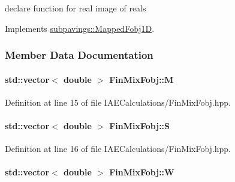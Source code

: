 declare function for real image of reals 



\-Implements \hyperlink{classsubpavings_1_1MappedFobj1D_abee3fbd4c06d7d2f6e276f31d485eb7c}{subpavings\-::\-Mapped\-Fobj1\-D}.



\subsubsection{\-Member \-Data \-Documentation}
\hypertarget{classFinMixFobj_a2490d2fff0e490e621534ecbfcf3793c}{
\paragraph[{\-M}]{\setlength{\rightskip}{0pt plus 5cm}std\-::vector$<$ double $>$ {\bf \-Fin\-Mix\-Fobj\-::\-M}}}\label{classFinMixFobj_a2490d2fff0e490e621534ecbfcf3793c}


\-Definition at line 15 of file \-I\-A\-E\-Calculations/\-Fin\-Mix\-Fobj.\-hpp.

\hypertarget{classFinMixFobj_a791efb5c972de7c4399a743c1959db88}{
\paragraph[{\-S}]{\setlength{\rightskip}{0pt plus 5cm}std\-::vector$<$ double $>$ {\bf \-Fin\-Mix\-Fobj\-::\-S}}}\label{classFinMixFobj_a791efb5c972de7c4399a743c1959db88}


\-Definition at line 16 of file \-I\-A\-E\-Calculations/\-Fin\-Mix\-Fobj.\-hpp.

\hypertarget{classFinMixFobj_ab29696cdae37fc54efb50cd9a56420b7}{
\paragraph[{\-W}]{\setlength{\rightskip}{0pt plus 5cm}std\-::vector$<$ double $>$ {\bf \-Fin\-Mix\-Fobj\-::\-W}}}\label{classFinMixFobj_ab29696cdae37fc54efb50cd9a56420b7}


